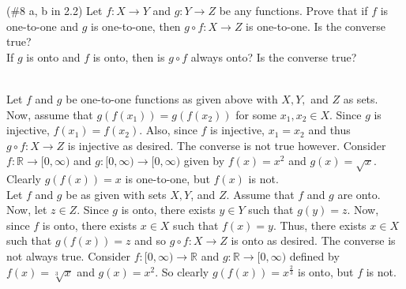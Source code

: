 (\#8 a, b in 2.2) Let $f:X\to Y$ and $g:Y\to Z$ be any functions.
Prove that if $f$ is one-to-one and $g$ is one-to-one, then $g\circ f:X\to Z$ is one-to-one. Is the
converse true?\\
If $g$ is onto and $f$ is onto, then is $g\circ f$ always onto? Is the converse true?\\

\begin{solution}\renewcommand{\qedsymbol}{}\ \\
    Let $f$ and $g$ be one-to-one functions as given above with $X, Y,$ and $Z$ as sets. Now, assume
    that $g(f(x_1))=g(f(x_2))$ for some $x_1, x_2\in X$. Since $g$ is injective, $f(x_1)=f(x_2)$. Also,
    since $f$ is injective, $x_1=x_2$ and thus $g\circ f:X\rightarrow Z$ is injective as desired. The
    converse is not true however. Consider $f:\mathbb{R}\rightarrow[0,\infty)$ and
    $g:[0,\infty)\rightarrow[0,\infty)$ given by $f(x)=x^2$ and $g(x)=\sqrt{x}$. Clearly
    $g(f(x))=x$ is one-to-one, but $f(x)$ is not.\\

    Let $f$ and $g$ be as given with sets $X, Y$, and $Z$. Assume that $f$ and $g$ are onto. Now, let
    $z\in Z$. Since $g$ is onto, there exists $y\in Y$ such that $g(y)=z$. Now, since $f$ is onto, there
    exists $x\in X$ such that $f(x)=y$. Thus, there exists $x\in X$ such that $g(f(x))=z$ and so
    $g\circ f:X\rightarrow Z$ is onto as desired. The converse is not always true. Consider
    $f:[0,\infty)\rightarrow\mathbb{R}$ and $g:\mathbb{R}\rightarrow[0,\infty)$ defined by
    $f(x)=\sqrt[3]{x}$ and $g(x)=x^2$. So clearly $g(f(x))=x^{\frac23}$ is onto, but $f$ is not.

\end{solution}